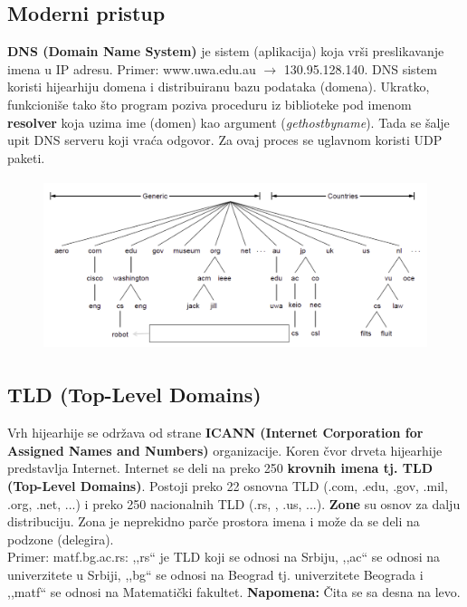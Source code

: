 \documentclass[a4paper]{article}
\begin{document}
    \subsection{Moderni pristup}
        \textbf{DNS (Domain Name System)} je sistem (aplikacija) koja vrši preslikavanje imena
        u IP adresu. Primer: www.uwa.edu.au $\rightarrow$ 130.95.128.140. DNS sistem koristi
        hijearhiju domena i distribuiranu bazu podataka (domena). Ukratko, funkcioniše 
        tako što program poziva proceduru iz biblioteke pod imenom \textbf{resolver} koja uzima ime 
        (domen) kao argument (\textit{gethostbyname}). Tada se šalje upit DNS serveru koji vraća odgovor.
        Za ovaj proces se uglavnom koristi UDP paketi.
        \begin{figure}[H]
            \begin{center}
                \includegraphics[width=120mm,height=50mm]{Slike/dns1.png}
            \end{center}
        \end{figure}
    \subsection{TLD (Top-Level Domains)}
        \indent Vrh hijearhije se održava od strane \textbf{ICANN (Internet Corporation for Assigned 
        Names and Numbers)} organizacije. Koren čvor drveta hijearhije predstavlja Internet. Internet
        se deli na preko 250 \textbf{krovnih imena tj. TLD (Top-Level Domains)}. Postoji preko 
        22 osnovna TLD (.com, .edu, .gov, .mil, .org, .net, ...) i preko 250 nacionalnih TLD (.rs,
        , .us, ...). \textbf{Zone} su osnov za dalju distribuciju. Zona je neprekidno parče 
        prostora imena i može da se deli na podzone (delegira). \\
        \indent Primer: matf.bg.ac.rs: ,,rs`` je TLD koji se odnosi na Srbiju, ,,ac`` se odnosi na 
        univerzitete u Srbiji, ,,bg`` se odnosi na Beograd tj. univerzitete Beograda i ,,matf``
        se odnosi na Matematički fakultet. \textbf{Napomena:} Čita se sa desna na levo. 
\end{document}
